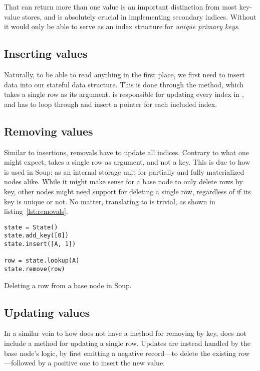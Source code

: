That  can return more than one value is an important
distinction from most key-value stores, and is absolutely crucial in
implementing secondary indices. Without it  would only be able to
serve as an index structure for \textit{unique primary keys}.

\subsection{Inserting values}
Naturally, to be able to read anything in the first place, we first need to
insert data into our stateful data structure. This is done through the
 method, which takes a single row as its argument.
 is responsible for updating every index in ,
and has to loop through and insert a pointer for each included index.

\subsection{Removing values}
Similar to insertions, removals have to update all indices. Contrary to what one
might expect,  takes a single row as argument, and not a
key. This is due to how  is used in Soup: as an internal storage
unit for partially and fully materialized nodes alike. While it might make sense
for a base node to only delete rows by key, other nodes might need support for
deleting a single row, regardless of if its key is unique or not. No matter,
translating  to  is trivial, as shown in
listing~\ref{lst:removals}.

\begin{listing}[H]\label{lst:removals}
  \begin{verbatim}
state = State()
state.add_key([0])
state.insert([A, 1])

row = state.lookup(A)
state.remove(row)
  \end{verbatim}

  \caption{Deleting a row from a base node in Soup.}
\end{listing}

\subsection{Updating values}
In a similar vein to how  does not have a method for removing by
key,  does not include a method for updating a single row. Updates
are instead handled by the base node's logic, by first emitting a negative
record---to delete the existing row---followed by a positive one to insert the
new value.

